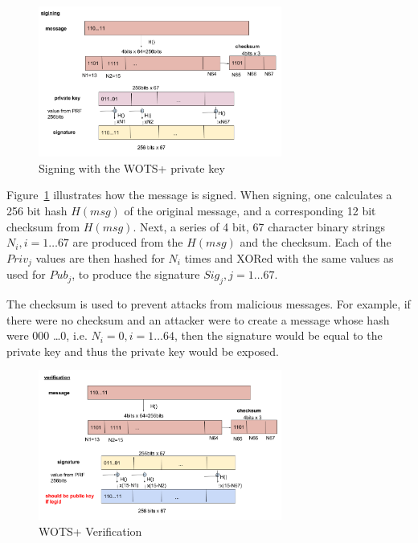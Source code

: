 \documentclass[a4paper,10pt,twocolumn]{article}
\begin{document}
	 \begin{figure}[ht]
		\begin{center}
		\includegraphics[width=80mm]{wots_sign.png}
		  \caption{Signing with the WOTS+ private key}
		\label{fig:wots_sign}
		\end{center}
	 \end{figure}
	
	\vspace{-3.5mm}
	
	
	 Figure~\ref{fig:wots_sign} illustrates how the message is signed. When signing, one calculates a 256 bit hash \( H(msg) \) of the original message, and a corresponding 12 bit checksum from \( H(msg) \).
	 Next, a series of 4 bit, 67 character binary strings \(N_i,i=1 \ldots 67\)  are produced from the \(H(msg)\) and the checksum. 
	 Each of the \( Priv_j \) values are then hashed for \(N_i\) times and XORed with the same 
	 values as used for \( Pub_{j} \), to produce the signature \( Sig_j, j=1 \ldots 67 \). 
	
	\vspace{2.5mm}
	
	The checksum is used to prevent 
	 attacks from malicious messages. For example, if there were no checksum and an attacker were to create a message whose hash were 000 
	 \ldots 0, i.e. \( N_i = 0, i=1 \ldots 64 \), then the signature would be equal to the private key and thus the private key would be 
	 exposed.
	
	 \begin{figure}[ht]
		\begin{center}
		\includegraphics[width=80mm]{wots_veri.png}
		  \caption{WOTS+ Verification}
		\label{fig:wots_veri}
		\end{center}
	 \end{figure}
	
\end{document}
